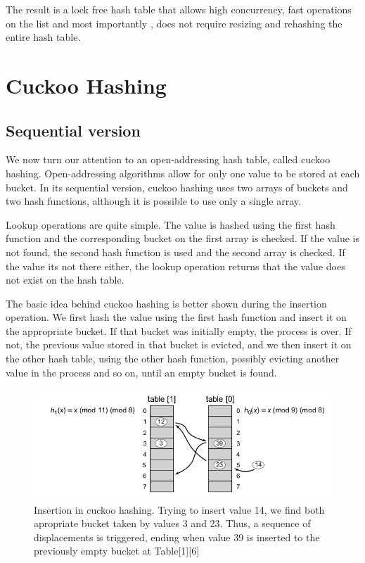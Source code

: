 The result is a lock free hash table that allows high concurrency, fast operations on the list and most importantly , does not require resizing and rehashing the entire hash table.

\section{Cuckoo Hashing}
\subsection{Sequential version}

We now turn our attention to an open-addressing hash table, called cuckoo hashing. Open-addressing algorithms allow for only one value to be stored at each bucket. In its sequential version, cuckoo hashing uses two arrays of buckets and two hash functions, although it is possible to use only a single array. 

Lookup operations are quite simple. The value is hashed using the first hash function and the corresponding bucket on the first array is checked. If the value is not found, the second hash function is used and the second array is  checked.  If the value its not there either, the lookup operation returns that the value does not exist on the hash table.

The basic idea behind cuckoo hashing is better shown during the insertion operation. We first hash the value using the first hash function and insert it on the appropriate bucket. If that bucket was initially empty, the process is over. If not, the previous value stored in that bucket is evicted, and we then insert it  on the other hash table, using the other hash function, possibly evicting another value in the process and so on, until an empty bucket is found.

\begin{figure}
 \centering
  \includegraphics[scale=0.5]{cuckoo_hashing.png}
\caption{Insertion in cuckoo hashing. Trying to insert value 14, we find both apropriate bucket taken by values 3 and 23. Thus, a sequence of displacements is triggered, ending when value 39 is inserted to the previously empty bucket at Table[1][6] }
\end{figure}

